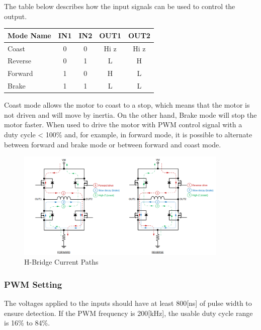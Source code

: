 \documentclass[english]{article}
\begin{document}
The table below describes how the input signals can be used to control the output. 
\begin{center}
    \begin{tabular}{lS[table-format=3]cS[table-format=2.2]S[table-format=1.2]}
        \toprule
        Mode Name & {IN1} & IN2 & {OUT1} & {OUT2} \\
        \midrule
        Coast & 0 & 0 & Hi z & Hi z \\
        Reverse & 0 & 1 & L & H \\
        Forward & 1 & 0 & H & L \\
        Brake & 1 & 1 & L & L \\
        \bottomrule
    \end{tabular}
\end{center}
Coast mode allows the motor to coast to a stop, which means that the motor is not
 driven and will move by inertia. On the other hand, Brake mode will stop the motor
  faster. When used to drive the motor with PWM control signal with a duty
   cycle < 100\% and, for example, in forward mode, it is possible to alternate between
forward and brake mode or between forward and coast mode. 
\begin{figure}[!h]
    \centering
    \includegraphics[width=0.90\textwidth, height=0.40\textheight]{figures/HBrige.png}
    \caption{H-Bridge Current Paths}
    \label{fig:bridge}
\end{figure}
\newpage
\subsubsection{PWM Setting}
The voltages applied to the inputs should have at least 800[ns] of pulse width 
to ensure detection. If the PWM frequency is 200[kHz], the usable duty cycle range 
is 16\% to 84\%.
\end{document}
